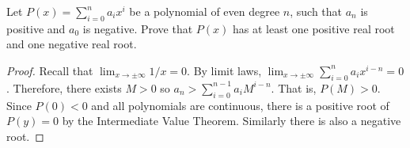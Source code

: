 \documentclass[oneside]{book}
\begin{document}
\begin{Qns}{}{}
    Let \(P(x)=\sum_{i=0}^{n}{a_ix^i}\) be a polynomial of even degree \(n\), such that \(a_n\) is positive and \(a_0\) is negative. Prove that \(P(x)\) has at least one positive real root and one negative real root.
\end{Qns}
\begin{proof}
    Recall that \(\lim_{x \to \pm \infty}1/x=0\). By limit laws, \(\lim_{x \to \pm \infty}\sum_{i=0}^{n}{a_ix^{i-n}}=0\). Therefore, there exists \(M>0\) so \(a_n>\sum_{i=0}^{n-1}{a_iM^{i-n}}\). That is, \(P(M)>0\). Since \(P(0)<0\) and all polynomials are continuous, there is a positive root of \(P(y)=0\) by the Intermediate Value Theorem. Similarly there is also a negative root.
\end{proof}
\end{document}
